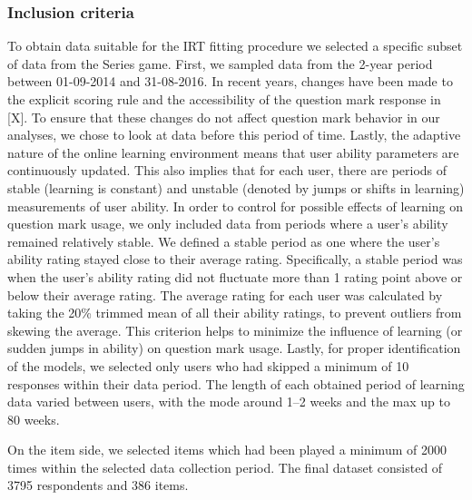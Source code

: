 \documentclass{edm_article}
\begin{document}
\subsubsection{Inclusion criteria}
To obtain data suitable for the IRT fitting procedure we selected a specific subset of data from the Series game. First, we sampled data from the 2-year period between 01-09-2014 and 31-08-2016. In recent years, changes have been made to the explicit scoring rule and the accessibility of the question mark response in [X]. To ensure that these changes do not affect question mark behavior in our analyses, we chose to look at data before this period of time. Lastly, the adaptive nature of the online learning environment means that user ability parameters are continuously updated. This also implies that for each user, there are periods of stable (learning is constant) and unstable (denoted by jumps or shifts in learning) measurements of user ability. In order to control for possible effects of learning on question mark usage, we only included data from periods where a user's ability remained relatively stable. We defined a stable period as one where the user's ability rating stayed close to their average rating. Specifically, a stable period was when the user's ability rating did not fluctuate more than 1 rating point above or below their average rating. The average rating for each user was calculated by taking the 20\% trimmed mean of all their ability ratings, to prevent outliers from skewing the average. This criterion helps to minimize the influence of learning (or sudden jumps in ability) on question mark usage. Lastly, for proper identification of the models, we selected only users who had skipped a minimum of 10 responses within their data period. The length of each obtained period of learning data varied between users, with the mode around 1--2 weeks and the max up to 80 weeks.

On the item side, we selected items which had been played a minimum of \num{2000} times within the selected data collection period. The final dataset consisted of \num{3795} respondents and \num{386} items. 
\end{document}
